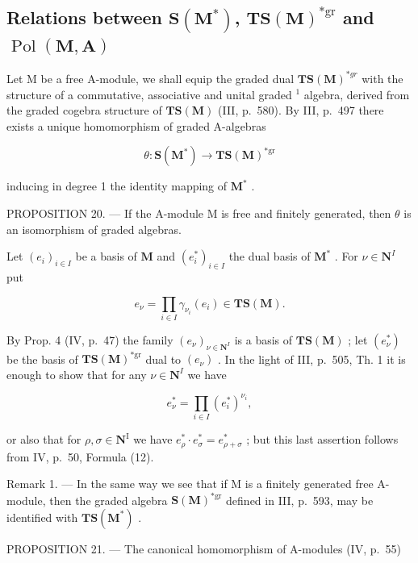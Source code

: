 \subsection{\texorpdfstring{Relations between \(\mathbf{S}(\mathbf{M}^{*})\), \(\mathbf{TS}(\mathbf{M})^{*\mathrm{gr}}\) and \(\operatorname{Pol}(\mathbf{M}, \mathbf{A})\)}{Relations between S(M*), the graded dual of TS(M), and Pol(M, A)}}

Let M be a free A-module, we shall equip the graded dual \(\mathbf{TS}(\mathbf{M})^{*gr}\) with the structure of a commutative, associative and unital graded \(^{1}\) algebra, derived from the graded cogebra structure of \(\mathbf{TS}(\mathbf{M})\) (III, p.~580). By III, p.~497 there exists a unique homomorphism of graded A-algebras

\[
\theta : \mathbf {S} (\mathbf {M} ^ {*}) \rightarrow \mathbf {T S} (\mathbf {M}) ^ {* \mathrm{gr}}
\]

inducing in degree 1 the identity mapping of \(\mathbf{M}^*\) .

PROPOSITION 20. --- If the A-module M is free and finitely generated, then \(\theta\) is an isomorphism of graded algebras.

Let \((e_i)_{i\in I}\) be a basis of \(\mathbf{M}\) and \((e_i^*)_{i\in I}\) the dual basis of \(\mathbf{M}^*\) . For \(\nu \in \mathbf{N}^I\) put

\[
e _ {\nu} = \prod_ {i \in I} \gamma_ {\nu_ {i}} (e _ {i}) \in \mathbf {T S} (\mathbf {M}).
\]

By Prop. 4 (IV, p.~47) the family \((e_{\nu})_{\nu \in \mathbf{N}^{I}}\) is a basis of \(\mathbf{TS}(\mathbf{M})\) ; let \((e_{\nu}^{*})\) be the basis of \(\mathbf{TS}(\mathbf{M})^{*\mathrm{gr}}\) dual to \((e_{\nu})\) . In the light of III, p.~505, Th. 1 it is enough to show that for any \(\nu \in \mathbf{N}^{I}\) we have

\[
e _ {\nu} ^ {*} = \prod_ {i \in I} \left(e _ {i} ^ {*}\right) ^ {\nu_ {i}},
\]

or also that for \(\rho, \sigma \in \mathbf{N}^{\mathrm{I}}\) we have \(e_{\rho}^{*} \cdot e_{\sigma}^{*} = e_{\rho + \sigma}^{*}\) ; but this last assertion follows from IV, p.~50, Formula (12).

Remark 1. --- In the same way we see that if M is a finitely generated free A-module, then the graded algebra \(\mathbf{S}(\mathbf{M})^{*\mathrm{gr}}\) defined in III, p.~593, may be identified with \(\mathbf{TS}(\mathbf{M}^*)\) .

PROPOSITION 21. --- The canonical homomorphism of A-modules (IV, p.~55)

